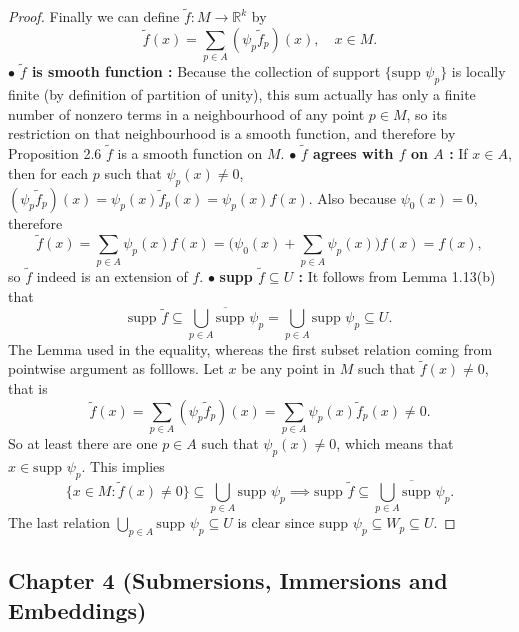 \documentclass[a4paper]{article}
\theoremstyle{remark}
\newcommand{\rk}{\mathbb{R}^k} %
\newcommand{\subhim}{\subseteq} %
\begin{document}
\begin{proof}
Finally we can define $\tilde{f} : M \to \rk$ by
$$
\tilde{f}(x) = \sum_{p \in A} (\psi_p \tilde{f}_p)(x),  \quad x\in M.
$$
$\bullet $ \textbf{$\tilde{f}$ is smooth function :} Because the collection of support $\{\text{supp } \psi_p\}$ is locally finite (by definition of partition of unity), this sum actually has only a finite number of nonzero terms in a neighbourhood of any point $p \in M$, so its restriction on that neighbourhood is a smooth function, and therefore by Proposition 2.6 $\tilde{f}$ is a smooth function on $M$. \newline
$\bullet $ \textbf{$\tilde{f}$ agrees with $f$ on $A$ :} If $x \in A$, then for each $p$ such that $\psi_p(x) \neq 0$, $(\psi_p\tilde{f}_p)(x) = \psi_p(x) \tilde{f}_p(x) = \psi_p(x) f(x)$. Also because $\psi_0(x) = 0$, therefore
$$
\tilde{f}(x) = \sum_{p\in A} \psi_p(x) f(x) = \Big(\psi_0(x) + \sum_{p \in A} \psi_p(x) \Big) f(x) = f(x),
$$
so $\tilde{f}$ indeed is an extension of $f$. \newline 
$\bullet $ \textbf{supp $\tilde{f} \subhim U$ : }It follows from Lemma 1.13(b) that 
$$
\text{supp } \tilde{f} \subhim \overline{\bigcup_{p \in A} \text{supp } \psi_p}  = \bigcup_{p \in A} \text{supp }\psi_p \subhim U. 
$$ 
The Lemma used in the equality, whereas the first subset relation coming from pointwise argument as folllows. Let $x$ be any point in $M$ such that $\tilde{f}(x) \neq 0$, that is
$$
\tilde{f}(x) = \sum_{p\in A} (\psi_p \tilde{f}_p)(x)  =  \sum_{p\in A} \psi_p(x) \tilde{f}_p(x) \neq 0.
$$
So at least there are one $p \in A$ such that $\psi_p(x) \neq 0$, which means that $x \in \text{supp }\psi_p$. This implies 
$$
\{x \in M :  \tilde{f}(x) \neq 0 \} \subseteq \bigcup_{p \in A} \text{supp } \psi_p \implies \text{supp }\tilde{f} \subseteq \overline{\bigcup_{p \in A} \text{supp } \psi_p}.
$$
The last relation $\bigcup_{p \in A} \text{supp }\psi_p \subhim U$ is clear since supp $\psi_p \subhim W_p \subhim U$.
\end{proof}

\subsection{Chapter 4 (Submersions, Immersions and  Embeddings)}
\end{document}
